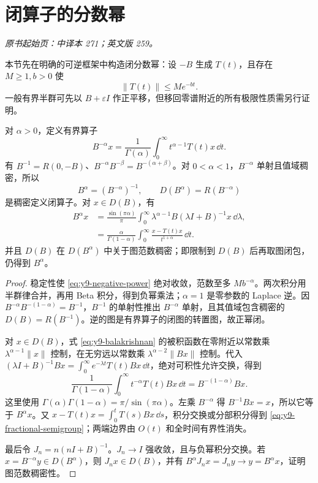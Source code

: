 \section{闭算子的分数幂}\label{sec:yosida-09-11}
\noindent\textit{原书起始页：中译本 271；英文版 259。}

本节先在明确的可逆框架中构造闭分数幂：设 $-B$ 生成 $T(t)$，且存在 $M\ge1,b>0$ 使
\begin{equation}\label{eq:y9-fractional-stability}
 \|T(t)\|\le Me^{-bt}.
\end{equation}
一般有界半群可先以 $B+\varepsilon I$ 作正平移，但移回零谱附近的所有极限性质需另行证明。

\begin{theorem}[负幂积分与闭正幂]\label{thm:y9-fractional-powers}
对 $\alpha>0$，定义有界算子
\begin{equation}\label{eq:y9-negative-power}
 B^{-\alpha}x=\frac1{\Gamma(\alpha)}\int_0^\infty t^{\alpha-1}T(t)x\,\dd t.
\end{equation}
有 $B^{-1}=R(0,-B)$、$B^{-\alpha}B^{-\beta}=B^{-(\alpha+\beta)}$。对 $0<\alpha<1$，$B^{-\alpha}$ 单射且值域稠密，所以
\[
 B^\alpha=(B^{-\alpha})^{-1},\qquad D(B^\alpha)=R(B^{-\alpha})
\]
是稠密定义闭算子。对 $x\in D(B)$，有
\begin{align}
 B^\alpha x&=\frac{\sin(\pi\alpha)}\pi\int_0^\infty
 \lambda^{\alpha-1}B(\lambda I+B)^{-1}x\,\dd\lambda,\label{eq:y9-balakrishnan}\\
 &=\frac{\alpha}{\Gamma(1-\alpha)}\int_0^\infty
 \frac{x-T(t)x}{t^{1+\alpha}}\,\dd t.\label{eq:y9-fractional-semigroup}
\end{align}
并且 $D(B)$ 在 $D(B^\alpha)$ 中关于图范数稠密；即限制到 $D(B)$ 后再取图闭包，仍得到 $B^\alpha$。
\end{theorem}
\begin{proof}
稳定性使 \eqref{eq:y9-negative-power} 绝对收敛，范数至多 $Mb^{-\alpha}$。两次积分用半群律合并，再用 Beta 积分，得到负幂乘法；$\alpha=1$ 是零参数的 Laplace 逆。因
$B^{-\alpha}B^{-(1-\alpha)}=B^{-1}$，$B^{-1}$ 的单射性推出 $B^{-\alpha}$ 单射，且其值域包含稠密的 $D(B)=R(B^{-1})$。逆的图是有界算子的闭图的转置图，故正幂闭。

对 $x\in D(B)$，式 \eqref{eq:y9-balakrishnan} 的被积函数在零附近以常数乘 $\lambda^{\alpha-1}\|x\|$ 控制，在无穷远以常数乘 $\lambda^{\alpha-2}\|Bx\|$ 控制。代入
$(\lambda I+B)^{-1}Bx=\int_0^\infty e^{-\lambda t}T(t)Bx\,\dd t$，绝对可积性允许交换，得到
\[
 \frac1{\Gamma(1-\alpha)}\int_0^\infty t^{-\alpha}T(t)Bx\,\dd t
 =B^{-(1-\alpha)}Bx.
\]
这里使用 $\Gamma(\alpha)\Gamma(1-\alpha)=\pi/\sin(\pi\alpha)$。左乘 $B^{-\alpha}$ 得 $B^{-1}Bx=x$，所以它等于 $B^\alpha x$。又 $x-T(t)x=\int_0^tT(s)Bx\,\dd s$，积分交换或分部积分得到 \eqref{eq:y9-fractional-semigroup}；两端边界由 $O(t)$ 和全时间有界性消失。

最后令 $J_n=n(nI+B)^{-1}$。$J_n\to I$ 强收敛，且与负幂积分交换。若 $x=B^{-\alpha}y\in D(B^\alpha)$，则 $J_nx\in D(B)$，并有 $B^\alpha J_nx=J_ny\to y=B^\alpha x$，证明图范数稠密性。
\end{proof}

